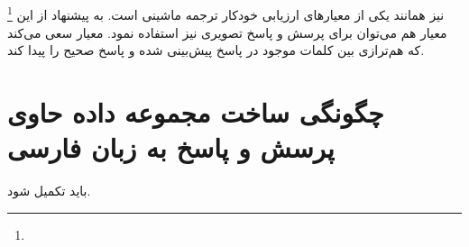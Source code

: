 \subsection[\lr{METEOR}]{\cite{denkowski2014meteor}}
		\footnote{}
		نیز همانند
	یکی از معیارهای ارزیابی خودکار ترجمه ماشینی است. به پیشنهاد 
	\cite{gurari2018vizwiz}
	 از این معیار هم می‌توان برای پرسش و پاسخ تصویری نیز استفاده نمود. معیار 
		سعی می‌کند که هم‌ترازی بین کلمات موجود در پاسخ پیش‌بینی شده و پاسخ صحیح را پیدا کند.


\section{ چگونگی ساخت مجموعه داده حاوی پرسش و پاسخ به زبان فارسی}
باید تکمیل شود.